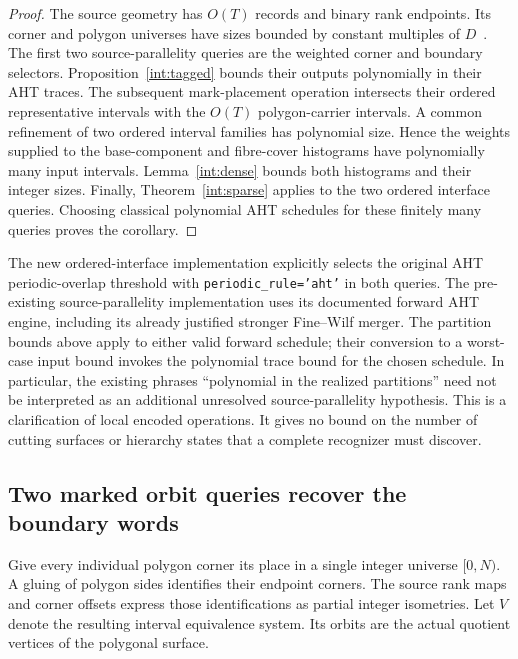 \begin{proof}
The source geometry has $O(T)$ records and binary rank endpoints.  Its
corner and polygon universes have sizes bounded by constant multiples of
$D$~\cite{ProveIt2026}.  The first two source-parallelity queries are the
weighted corner and boundary selectors.  Proposition~\ref{int:tagged}
bounds their outputs polynomially in their AHT traces.  The subsequent
mark-placement operation intersects their ordered representative intervals
with the $O(T)$ polygon-carrier intervals.  A common refinement of two
ordered interval families has polynomial size.  Hence the weights supplied
to the base-component and fibre-cover histograms have polynomially many
input intervals.  Lemma~\ref{int:dense} bounds both histograms and their
integer sizes.  Finally, Theorem~\ref{int:sparse} applies to the two ordered
interface queries.  Choosing classical polynomial AHT schedules for these
finitely many queries proves the corollary.
\end{proof}

The new ordered-interface implementation explicitly selects the original
AHT periodic-overlap threshold with \texttt{periodic\_rule='aht'} in both
queries.  The pre-existing source-parallelity implementation uses its
documented forward AHT engine, including its already justified stronger
Fine--Wilf merger.  The partition bounds above apply to either valid forward
schedule; their conversion to a worst-case input bound invokes the
polynomial trace bound for the chosen schedule.  In particular, the existing
phrases ``polynomial in the realized partitions'' need not be interpreted as
an additional unresolved source-parallelity hypothesis.  This is a
clarification of local encoded operations.  It gives no bound on the number
of cutting surfaces or hierarchy states that a complete recognizer must
discover.

\subsection{Two marked orbit queries recover the boundary words}
\label{int:construction}

Give every individual polygon corner its place in a single integer universe
$[0,N)$.  A gluing of polygon sides identifies their endpoint corners.  The
source rank maps and corner offsets express those identifications as partial
integer isometries.  Let $V$ denote the resulting interval equivalence
system.  Its orbits are the actual quotient vertices of the polygonal
surface.

